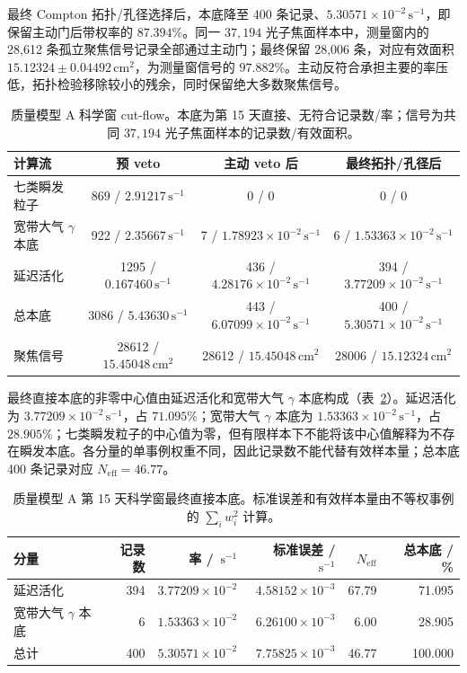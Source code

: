 \documentclass[11pt]{article}
\newcommand{\cps}{\,\mathrm{s^{-1}}}
\begin{document}
最终 Compton 拓扑/孔径选择后，本底降至 400 条记录、$5.30571\times10^{-2}\cps$，即保留主动门后带权率的 $87.394\%$。同一 $37{,}194$ 光子焦面样本中，测量窗内的 28,612 条孤立聚焦信号记录全部通过主动门；最终保留 28,006 条，对应有效面积 $15.12324\pm0.04492\,\mathrm{cm^2}$，为测量窗信号的 $97.882\%$。主动反符合承担主要的率压低，拓扑检验移除较小的残余，同时保留绝大多数聚焦信号。

\begin{table}[H]
\centering
\caption{质量模型 A 科学窗 cut-flow。本底为第 15 天直接、无符合记录数/率；信号为共同 $37{,}194$ 光子焦面样本的记录数/有效面积。}
\label{tab:phase2_cutflow}
\footnotesize
\begin{tabular}{lccc}
\toprule
计算流 & 预 veto & 主动 veto 后 & 最终拓扑/孔径后 \\
\midrule
七类瞬发粒子 & 869 / $2.91217\cps$ & 0 / 0 & 0 / 0 \\
宽带大气 $\gamma$ 本底 & 922 / $2.35667\cps$ & 7 / $1.78923\times10^{-2}\cps$ & 6 / $1.53363\times10^{-2}\cps$ \\
延迟活化 & 1295 / $0.167460\cps$ & 436 / $4.28176\times10^{-2}\cps$ & 394 / $3.77209\times10^{-2}\cps$ \\
总本底 & 3086 / $5.43630\cps$ & 443 / $6.07099\times10^{-2}\cps$ & 400 / $5.30571\times10^{-2}\cps$ \\
聚焦信号 & 28612 / $15.45048\,\mathrm{cm^2}$ & 28612 / $15.45048\,\mathrm{cm^2}$ & 28006 / $15.12324\,\mathrm{cm^2}$ \\
\bottomrule
\end{tabular}
\end{table}

最终直接本底的非零中心值由延迟活化和宽带大气 $\gamma$ 本底构成（表~\ref{tab:reference_background_budget_zh}）。延迟活化为 $3.77209\times10^{-2}\cps$，占 $71.095\%$；宽带大气 $\gamma$ 本底为 $1.53363\times10^{-2}\cps$，占 $28.905\%$；七类瞬发粒子的中心值为零，但有限样本下不能将该中心值解释为不存在瞬发本底。各分量的单事例权重不同，因此记录数不能代替有效样本量；总本底 400 条记录对应 $N_{\mathrm{eff}}=46.77$。

\begin{table}[H]
\centering
\caption{质量模型 A 第 15 天科学窗最终直接本底。标准误差和有效样本量由不等权事例的 $\sum_i w_i^2$ 计算。}
\label{tab:reference_background_budget_zh}
\footnotesize
\begin{tabular}{lrrrrr}
\toprule
分量 & 记录数 & 率 / $\cps$ & 标准误差 / $\cps$ & $N_{\mathrm{eff}}$ & 总本底 / \% \\
\midrule
延迟活化 & 394 & $3.77209\times10^{-2}$ & $4.58152\times10^{-3}$ & 67.79 & 71.095 \\
宽带大气 $\gamma$ 本底 & 6 & $1.53363\times10^{-2}$ & $6.26100\times10^{-3}$ & 6.00 & 28.905 \\
\midrule
总计 & 400 & $5.30571\times10^{-2}$ & $7.75825\times10^{-3}$ & 46.77 & 100.000 \\
\bottomrule
\end{tabular}
\end{table}
\end{document}
